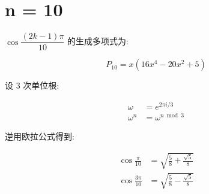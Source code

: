 \chapter{n = 10}\label{ch:cos10}

$\cos\dfrac{(2k-1)π}{10}$ 的生成多项式为:

$$
P_{10} = x \left(16x^4 - 20x^2 + 5\right)
$$

设 3 次单位根:

$$
\begin{aligned}
ω&= e^{2πi/3}\\
ω^n&=ω^{n\bmod 3}
\end{aligned}
$$

逆用欧拉公式得到:

$$
\begin{aligned}
\cos\frac{ π}{10}&=\sqrt{\frac{5}{8}+\frac{\sqrt{5}}{8}}\\
\cos\frac{3π}{10}&=\sqrt{\frac{5}{8}-\frac{\sqrt{5}}{8}}\\
\end{aligned}
$$